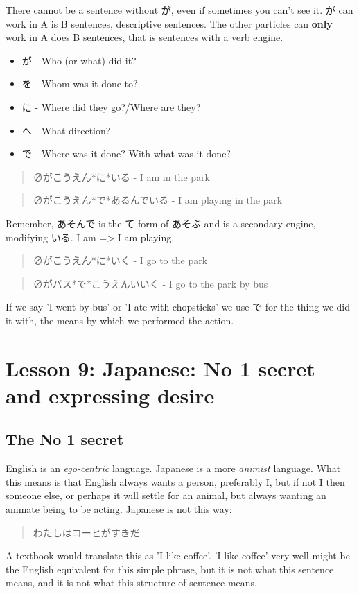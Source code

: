 \documentclass[11pt]{article}
\begin{document}
There cannot be a sentence without が, even if sometimes you can't see it. が can work in A is B sentences, descriptive sentences. The other particles can \textbf{only} work in A does B sentences, that is sentences with a verb engine.
\begin{itemize}
\item が - Who (or what) did it?
\item を - Whom was it done to?
\item に - Where did they go?/Where are they?
\item へ - What direction?
\item で - Where was it done? With what was it done?
\end{itemize}
\begin{quote}
∅がこうえん*に*いる - I am in the park
\end{quote}
\begin{quote}
∅がこうえん*で*あるんでいる - I am playing in the park
\end{quote}
Remember, あそんで is the て form of あそぶ and is a secondary engine, modifying いる. I am => I am playing.
\begin{quote}
∅がこうえん*に*いく - I go to the park
\end{quote}
\begin{quote}
∅がバス*で*こうえんいいく - I go to the park by bus
\end{quote}
If we say 'I went by bus' or 'I ate with chopsticks' we use で for the thing we did it with, the means by which we performed the action.
\section{Lesson 9: Japanese: No 1 secret and expressing desire}
\label{sec:orgbea2ab9}
\subsection{The No 1 secret}
\label{sec:org8f9f8c6}
English is an \emph{ego-centric} language. Japanese is a more \emph{animist} language. What this means is that English always wants a person, preferably I, but if not I then someone else, or perhaps it will settle for an animal, but always wanting an animate being to be acting. Japanese is not this way:
\begin{quote}
わたしはコーヒがすきだ
\end{quote}
A textbook would translate this as 'I like coffee'. 'I like coffee' very well might be the English equivalent for this simple phrase, but it is not what this sentence means, and it is not what this structure of sentence means.
\end{document}
